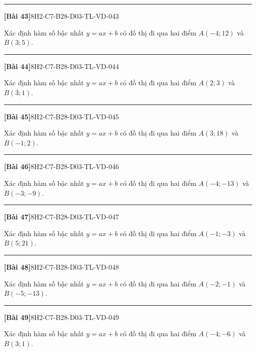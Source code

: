 \documentclass[12pt,a4paper]{article}
\newif\ifloigiai
\newenvironment{cauhoi}[2]{%
  \par\medskip\noindent\rule{\textwidth}{0.4pt}\par\nopagebreak
  \noindent\textbf{[#1]}\hfill{\scriptsize\ttfamily #2}\par\nopagebreak\smallskip}{\par}
\newcommand{\loigiai}[1]{\ifloigiai\par\smallskip\noindent\textit{Lời giải.} #1\par\fi}
\begin{document}
\begin{cauhoi}{Bài 43}{8H2-C7-B28-D03-TL-VD-043}
Xác định hàm số bậc nhất $y=ax+b$ có đồ thị đi qua hai điểm $A(-4;12)$ và $B(3;5)$.
\loigiai{Thay toạ độ $A$, $B$ vào $y=ax+b$ ta có hệ $12=-4a+b$ và $5=3a+b$. Trừ hai vế: $a=\dfrac{12-5}{-4-3}=-1$. Suy ra $b=12+1\cdot(-4)=8$. Vậy $y=-x+8$.}
\end{cauhoi}
\begin{cauhoi}{Bài 44}{8H2-C7-B28-D03-TL-VD-044}
Xác định hàm số bậc nhất $y=ax+b$ có đồ thị đi qua hai điểm $A(2;3)$ và $B(3;1)$.
\loigiai{Thay toạ độ $A$, $B$ vào $y=ax+b$ ta có hệ $3=2a+b$ và $1=3a+b$. Trừ hai vế: $a=\dfrac{3-1}{2-3}=-2$. Suy ra $b=3+2\cdot(2)=7$. Vậy $y=-2x+7$.}
\end{cauhoi}
\begin{cauhoi}{Bài 45}{8H2-C7-B28-D03-TL-VD-045}
Xác định hàm số bậc nhất $y=ax+b$ có đồ thị đi qua hai điểm $A(3;18)$ và $B(-1;2)$.
\loigiai{Thay toạ độ $A$, $B$ vào $y=ax+b$ ta có hệ $18=3a+b$ và $2=-a+b$. Trừ hai vế: $a=\dfrac{18-2}{3+1}=4$. Suy ra $b=18-4\cdot(3)=6$. Vậy $y=4x+6$.}
\end{cauhoi}
\begin{cauhoi}{Bài 46}{8H2-C7-B28-D03-TL-VD-046}
Xác định hàm số bậc nhất $y=ax+b$ có đồ thị đi qua hai điểm $A(-4;-13)$ và $B(-3;-9)$.
\loigiai{Thay toạ độ $A$, $B$ vào $y=ax+b$ ta có hệ $-13=-4a+b$ và $-9=-3a+b$. Trừ hai vế: $a=\dfrac{-13+9}{-4+3}=4$. Suy ra $b=-13-4\cdot(-4)=3$. Vậy $y=4x+3$.}
\end{cauhoi}
\begin{cauhoi}{Bài 47}{8H2-C7-B28-D03-TL-VD-047}
Xác định hàm số bậc nhất $y=ax+b$ có đồ thị đi qua hai điểm $A(-1;-3)$ và $B(5;21)$.
\loigiai{Thay toạ độ $A$, $B$ vào $y=ax+b$ ta có hệ $-3=-a+b$ và $21=5a+b$. Trừ hai vế: $a=\dfrac{-3-21}{-1-5}=4$. Suy ra $b=-3-4\cdot(-1)=1$. Vậy $y=4x+1$.}
\end{cauhoi}
\begin{cauhoi}{Bài 48}{8H2-C7-B28-D03-TL-VD-048}
Xác định hàm số bậc nhất $y=ax+b$ có đồ thị đi qua hai điểm $A(-2;-1)$ và $B(-5;-13)$.
\loigiai{Thay toạ độ $A$, $B$ vào $y=ax+b$ ta có hệ $-1=-2a+b$ và $-13=-5a+b$. Trừ hai vế: $a=\dfrac{-1+13}{-2+5}=4$. Suy ra $b=-1-4\cdot(-2)=7$. Vậy $y=4x+7$.}
\end{cauhoi}
\begin{cauhoi}{Bài 49}{8H2-C7-B28-D03-TL-VD-049}
Xác định hàm số bậc nhất $y=ax+b$ có đồ thị đi qua hai điểm $A(-4;-6)$ và $B(3;1)$.
\loigiai{Thay toạ độ $A$, $B$ vào $y=ax+b$ ta có hệ $-6=-4a+b$ và $1=3a+b$. Trừ hai vế: $a=\dfrac{-6-1}{-4-3}=1$. Suy ra $b=-6-1\cdot(-4)=-2$. Vậy $y=x-2$.}
\end{cauhoi}
\end{document}
